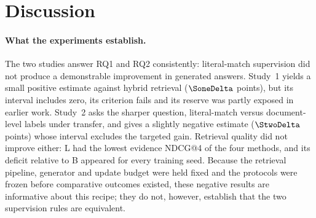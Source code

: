 \section{Discussion}\label{sec:discussion}
\paragraph{What the experiments establish.} The two studies answer RQ1 and RQ2 consistently: literal-match supervision did not produce a demonstrable improvement in generated answers. Study~1 yields a small positive estimate against hybrid retrieval ($\SoneDelta$ points), but its interval includes zero, its criterion fails and its reserve was partly exposed in earlier work. Study~2 asks the sharper question, literal-match versus document-level labels under transfer, and gives a slightly negative estimate ($\StwoDelta$ points) whose interval excludes the targeted gain. Retrieval quality did not improve either: L had the lowest evidence NDCG@4 of the four methods, and its deficit relative to B appeared for every training seed. Because the retrieval pipeline, generator and update budget were held fixed and the protocols were frozen before comparative outcomes existed, these negative results are informative about this recipe; they do not, however, establish that the two supervision rules are equivalent.

